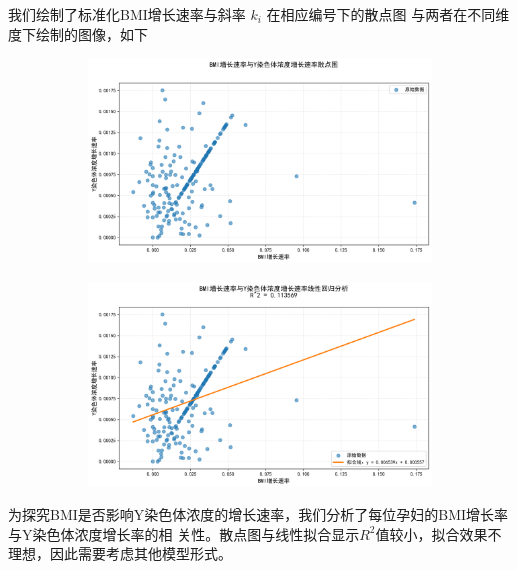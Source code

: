 \documentclass{article}
\begin{document}
我们绘制了标准化BMI增长速率与斜率 $k_i$ 在相应编号下的散点图
与两者在不同维度下绘制的图像，如下
\begin{figure}[H]
    \centering
    \begin{subfigure}[b]{0.45\textwidth}  %
        \centering
        \includegraphics[width=\textwidth]{graph/points.png}  %
        \label{fig:sub1}  %
    \end{subfigure}
    \hspace{0.05\textwidth}  %
    \begin{subfigure}[b]{0.45\textwidth}
        \centering
        \includegraphics[width=\textwidth]{graph/linear_regression.png}
        \label{fig:sub2}
    \end{subfigure}
    \label{fig:two}  %
\end{figure}

为探究BMI是否影响Y染色体浓度的增长速率，我们分析了每位孕妇的BMI增长率与Y染色体浓度增长率的相
关性。散点图与线性拟合显示$R^2$值较小，拟合效果不理想，因此需要考虑其他模型形式。
\end{document}
